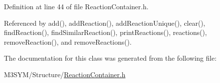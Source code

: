 Definition at line 44 of file Reaction\+Container.\+h.



Referenced by add(), add\+Reaction(), add\+Reaction\+Unique(), clear(), find\+Reaction(), find\+Similar\+Reaction(), print\+Reactions(), reactions(), remove\+Reaction(), and remove\+Reactions().



The documentation for this class was generated from the following file\+:\begin{DoxyCompactItemize}
\item 
M3\+S\+Y\+M/\+Structure/\hyperlink{ReactionContainer_8h}{Reaction\+Container.\+h}\end{DoxyCompactItemize}
